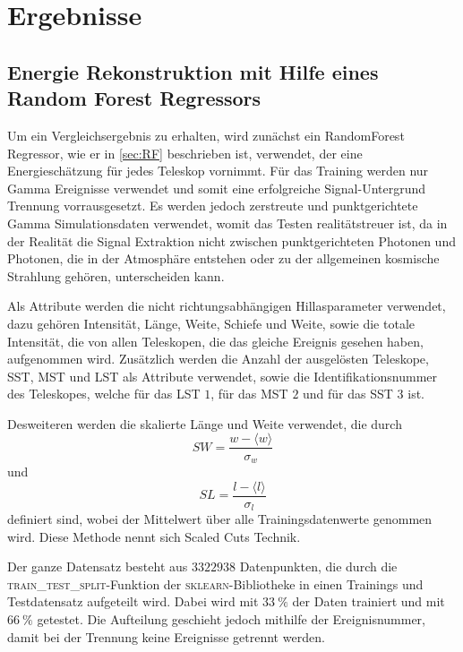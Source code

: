 \chapter{Ergebnisse}

\section{Energie Rekonstruktion mit Hilfe eines Random Forest Regressors}

Um ein Vergleichsergebnis zu erhalten, wird zunächst ein RandomForest Regressor, wie er in \autoref{sec:RF} beschrieben ist, verwendet,
der eine Energieschätzung für jedes Teleskop vornimmt.
Für das Training werden nur Gamma Ereignisse verwendet und somit eine erfolgreiche Signal-Untergrund Trennung vorrausgesetzt.
Es werden jedoch zerstreute und punktgerichtete Gamma Simulationsdaten verwendet, womit das Testen realitätstreuer ist, da in der
Realität die Signal Extraktion nicht zwischen punktgerichteten Photonen und Photonen, die in der Atmosphäre entstehen oder zu der
allgemeinen kosmische Strahlung gehören, unterscheiden kann.

Als Attribute werden die nicht richtungsabhängigen Hillasparameter verwendet, dazu gehören Intensität, Länge, Weite, Schiefe und Weite, sowie
die totale Intensität, die von allen Teleskopen, die das gleiche Ereignis gesehen haben, aufgenommen wird.
Zusätzlich werden die Anzahl der ausgelösten Teleskope, SST, MST und LST als Attribute verwendet, sowie die Identifikationsnummer des
Teleskopes, welche für das LST $1$, für das MST $2$ und für das SST $3$ ist.

Desweiteren werden die skalierte Länge und Weite verwendet, die durch
\begin{equation}
  SW = \frac{w- \langle w \rangle}{\sigma_w}
\end{equation}
und
\begin{equation}
  SL = \frac{l - \langle l \rangle}{\sigma_l}
\end{equation}
definiert sind, wobei der Mittelwert über alle Trainingsdatenwerte genommen wird. Diese Methode nennt sich Scaled Cuts Technik.\cite[104]{HESS}

Der ganze Datensatz besteht aus $\num{3322938}$ Datenpunkten, die durch die \textsc{train\_test\_split}-Funktion der \textsc{sklearn}-Bibliotheke
in einen Trainings und Testdatensatz aufgeteilt wird. Dabei wird mit $\SI{33}{\percent}$ der Daten trainiert und mit $\SI{66}{\percent}$
getestet. Die Aufteilung geschieht jedoch mithilfe der Ereignisnummer, damit bei der Trennung keine Ereignisse getrennt werden.

